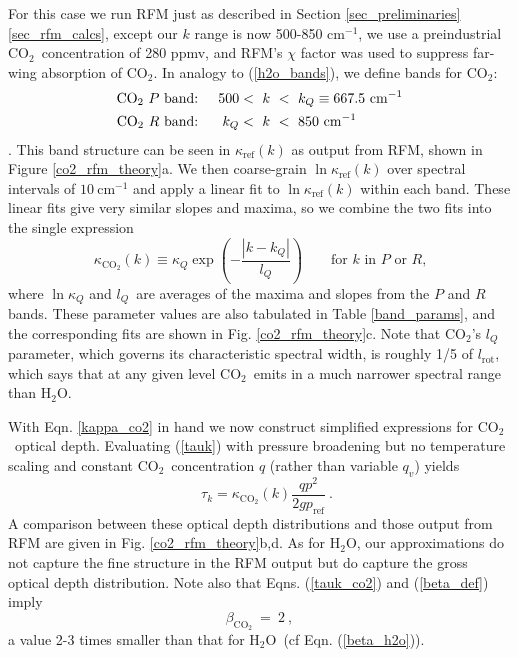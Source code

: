 \documentclass{ametsoc}
\newcommand{\beqn}{\begin{equation}}
\newcommand{\eeqn}{\end{equation}}
\newcommand{\beqa}{\begin{eqnarray}}
\newcommand{\eeqa}{\end{eqnarray}}
\newcommand{\n}{\nonumber}
\newcommand{\eqnref}[1]{(\ref{#1})}
\newcommand{\cminverse}{\ensuremath{\mathrm{cm^{-1}}}}
\newcommand{\qv}{\ensuremath{q_v}}
\newcommand{\cotwo}{\ensuremath{\mathrm{CO_2}}}
\newcommand{\htwo}{\ensuremath{\mathrm{H_2O}}}
\newcommand{\tauk}{\ensuremath{\tau_k}}
\newcommand{\kapparef}{\ensuremath{\kappa_{\mathrm{ref}}}}
\newcommand{\pref}{\ensuremath{p_{\mathrm{ref}}}}
\newcommand{\kappaQ}{\ensuremath{\kappa_Q}}
\newcommand{\kQ}{\ensuremath{k_Q}}
\newcommand{\lrot}{\ensuremath{l_\mathrm{rot}}}
\newcommand{\lQ}{\ensuremath{l_{Q}}}
\begin{document}
For this case we run RFM just as described in Section \ref{sec_preliminaries}\ref{sec_rfm_calcs}, except our $k$ range is now 500-850 \cminverse, we use a preindustrial \cotwo\ concentration of 280 ppmv, and RFM's $\chi$ factor was used to suppress far-wing absorption of \cotwo. In analogy to  \eqnref{h2o_bands}, we define bands for \cotwo:
\beqa
		\begin{split}
	    		\text{\cotwo\ $P$ band: } && 500 &<\   k\ <\  \kQ\equiv 667.5\ \cminverse \\
    			\text{\cotwo\ $R$ band: } & & \kQ &<\   k\ < \  850\ \cminverse  \ 
		\end{split}
		\label{co2_bands}
\eeqa
 \citep[here \kQ\ denotes the spectral location of the main \cotwo\ $Q$ branch, which lies between its associated $P$ and $R$ branches but has a much smaller spectral width, e.g.][]{coakley2014}. This band structure can be seen in $\kapparef(k)$ as output from RFM, shown in Figure \ref{co2_rfm_theory}a. We then coarse-grain $\ln \kapparef(k)$ over spectral intervals of $10 \ \cminverse$ and apply a linear fit to $\ln \kapparef(k)$ within each band. These linear fits give very similar slopes and maxima, so we combine the two fits into the single expression 
  \beqn
 	\kappa_{\cotwo}(k)  \equiv   \kappaQ \exp\left(-\frac{|k-\kQ|}{\lQ}\right) \quad \quad \text{for $k$ in $P$ or $R$,}   			
	\label{kappa_co2}  
\eeqn
 where $\ln \kappaQ$ and  \lQ\ are averages of the maxima and slopes from the $P$ and $R$ bands. These parameter values are also tabulated in Table \ref{band_params}, and the corresponding fits are shown in  Fig. \ref{co2_rfm_theory}c. Note that \cotwo's $\lQ$ parameter, which governs its characteristic spectral width, is roughly 1/5 of \lrot,  which says that at any given level \cotwo\ emits in a much narrower spectral range than \htwo. 

With Eqn.  \eqref{kappa_co2} in hand we now construct simplified expressions for  \cotwo\ optical depth. Evaluating  \eqnref{tauk} with pressure broadening but no temperature scaling and constant \cotwo\ concentration $q$ (rather than variable \qv) yields
\beqn
	\quad \tauk  = \kappa_{\cotwo}(k)\frac{qp^2}{2g\pref}   \ .
	\label{tauk_co2}
\eeqn
 A comparison between these optical depth distributions and those output from RFM are given in Fig.  \ref{co2_rfm_theory}b,d. As for \htwo, our approximations do not capture the fine structure in the RFM output but do capture the gross optical depth distribution. Note also that Eqns. \eqnref{tauk_co2} and \eqnref{beta_def} imply 
 \beqn
 	\beta_{\cotwo} \ = \ 2 \ ,
	\n
\eeqn
a value 2-3 times smaller than that for \htwo\ (cf Eqn. \eqnref{beta_h2o}).
\end{document}
